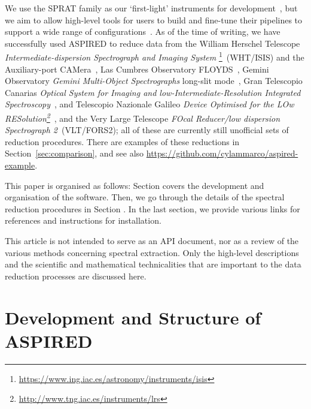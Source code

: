 \documentclass[twocolumn, linenumbers]{aastex631}
\begin{document}
We use the SPRAT family as our `first-light' instruments for development~\citep{2014SPIE.9147E..8HP},
but we aim to allow high-level tools for users to build and fine-tune their pipelines to support
a wide range of configurations~\citep{2020arXiv201203505L, marco_2021_4463569}. As of the time of
writing, we have successfully used \textsc{ASPIRED} to reduce data from the William Herschel Telescope
\textit{Intermediate-dispersion Spectrograph and Imaging System}
\footnote{\url{https://www.ing.iac.es/astronomy/instruments/isis}}~(WHT/ISIS)
and the Auxiliary-port CAMera~\citep[ACAM;][]{2008SPIE.7014E..6XB}, Las Cumbres
Observatory FLOYDS~\citep[LCO/FLOYDS;][]{2013PASP..125.1031B}, Gemini Observatory
\textit{Gemini Multi-Object Spectrographs} long-slit
mode~\citep[Gemini/GMOS-LS;][]{2004PASP..116..425H}, Gran Telescopio Canarias \textit{Optical
System for Imaging and low-Intermediate-Resolution Integrated
Spectroscopy}~\citep[GTC/OSIRIS;][]{2000SPIE.4008..623C}, and Telescopio Nazionale Galileo
\textit{Device Optimised for the LOw
RESolution\footnote{\url{http://www.tng.iac.es/instruments/lrs}}}~\citep[TNG/DOLORES;][]{1999ldss.work..157M},
and the Very Large Telescope \textit{FOcal Reducer/low dispersion Spectrograph 2}~(VLT/FORS2);
all of these are currently still unofficial sets of reduction procedures. There
are examples of these reductions in Section~\ref{sec:comparison}, and see also
\url{https://github.com/cylammarco/aspired-example}.

This paper is organised as follows: Section  covers the development and
organisation of the software. Then, we go through the details of the spectral reduction
procedures in Section . In the last section, we provide various links
for references and instructions for installation.

This article is not intended to serve as an API document, nor as a review of the
various methods concerning spectral extraction. Only the high-level
descriptions and the scientific and mathematical technicalities that are
important to the data reduction processes are discussed here.

\section{Development and Structure of \textsc{ASPIRED}}
\end{document}
